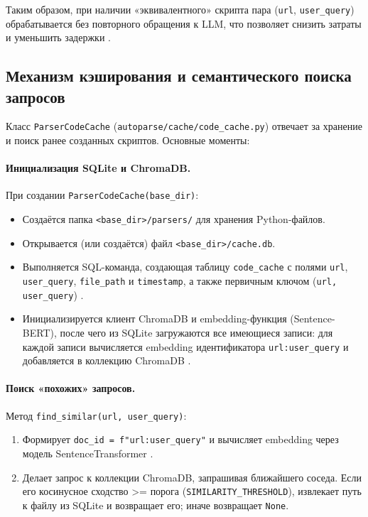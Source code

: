Таким образом, при наличии «эквивалентного» скрипта пара (\texttt{url}, \texttt{user\_query}) обрабатывается без повторного обращения к LLM, что позволяет снизить затраты и уменьшить задержки \cite{Dong2022CacheLLM, OpenAI2023Costs}.

\subsection{Механизм кэширования и семантического поиска запросов}
\label{subsec:solution4}

Класс \texttt{ParserCodeCache} (\texttt{autoparse/cache/code\_cache.py}) отвечает за хранение и поиск ранее созданных скриптов. Основные моменты:

\paragraph{Инициализация SQLite и ChromaDB.}
При создании \texttt{ParserCodeCache(base\_dir)}:
\begin{itemize}
    \item Создаётся папка \texttt{<base\_dir>/parsers/} для хранения Python-файлов.
    \item Открывается (или создаётся) файл \texttt{<base\_dir>/cache.db}.
    \item Выполняется SQL-команда, создающая таблицу \texttt{code\_cache} с полями \texttt{url}, \texttt{user\_query}, \texttt{file\_path} и \texttt{timestamp}, а также первичным ключом (\texttt{url, user\_query}) \cite{SQLiteDocumentation}.
    \item Инициализируется клиент ChromaDB и embedding-функция (Sentence-BERT), после чего из SQLite загружаются все имеющиеся записи: для каждой записи вычисляется embedding идентификатора \texttt{url:user\_query} и добавляется в коллекцию ChromaDB \cite{Reimers2019, ChromaDBDocumentation}.
\end{itemize}

\paragraph{Поиск «похожих» запросов.}
Метод \texttt{find\_similar(url, user\_query)}:
\begin{enumerate}
    \item Формирует \texttt{doc\_id = f"{url}:{user\_query}"} и вычисляет embedding через модель SentenceTransformer \cite{Reimers2019}.
    \item Делает запрос к коллекции ChromaDB, запрашивая ближайшего соседа. Если его косинусное сходство >= порога (\texttt{SIMILARITY\_THRESHOLD}), извлекает путь к файлу из SQLite и возвращает его; иначе возвращает \texttt{None}.
\end{enumerate}

